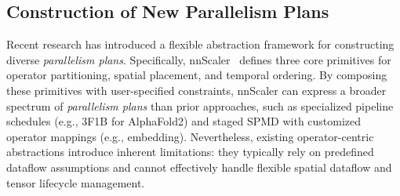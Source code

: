 \documentclass[letterpaper,twocolumn,10pt]{article}
\begin{document}
\subsection{Construction of New Parallelism Plans}



Recent research has introduced a flexible abstraction framework for constructing diverse \textit{parallelism plans}. Specifically, nnScaler~\cite{lin2024nnscaler} defines three core primitives for operator partitioning, spatial placement, and temporal ordering. By composing these primitives with user-specified constraints, nnScaler can express a broader spectrum of \textit{parallelism plans} than prior approaches, such as specialized pipeline schedules (e.g., 3F1B for AlphaFold2) and staged SPMD with customized operator mappings (e.g., embedding). Nevertheless, existing operator-centric abstractions introduce inherent limitations: they typically rely on predefined dataflow assumptions and cannot effectively handle flexible spatial dataflow and tensor lifecycle management.
\end{document}
